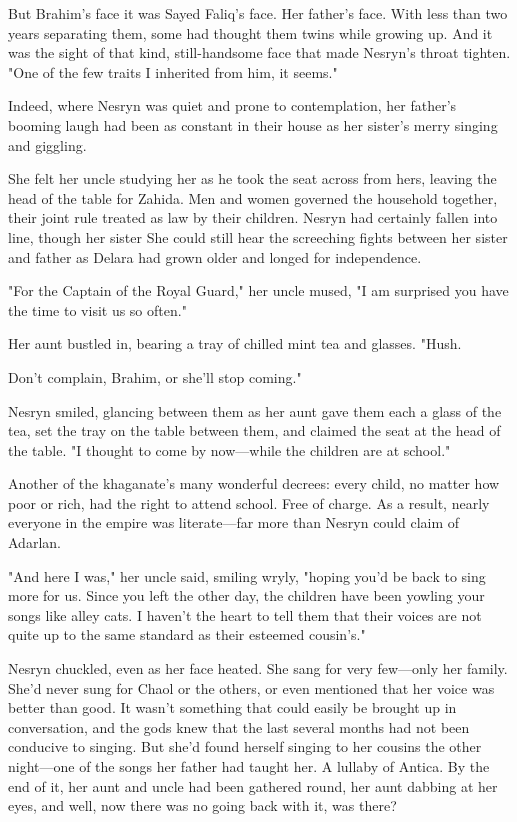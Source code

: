 But Brahim's face  it was Sayed Faliq's face. Her father's face. With less than two years separating them, some had thought them twins while growing up. And it was the sight of that kind, still-handsome face that made Nesryn's throat tighten. "One of the few traits I inherited from him, it seems."

Indeed, where Nesryn was quiet and prone to contemplation, her father's booming laugh had been as constant in their house as her sister's merry singing and giggling.

She felt her uncle studying her as he took the seat across from hers, leaving the head of the table for Zahida. Men and women governed the household together, their joint rule treated as law by their children. Nesryn had certainly fallen into line, though her sister  She could still hear the screeching fights between her sister and father as Delara had grown older and longed for independence.

"For the Captain of the Royal Guard," her uncle mused, "I am surprised you have the time to visit us so often."

Her aunt bustled in, bearing a tray of chilled mint tea and glasses. "Hush.

Don't complain, Brahim, or she'll stop coming."

Nesryn smiled, glancing between them as her aunt gave them each a glass of the tea, set the tray on the table between them, and claimed the seat at the head of the table. "I thought to come by now---while the children are at school."

Another of the khaganate's many wonderful decrees: every child, no matter how poor or rich, had the right to attend school. Free of charge. As a result, nearly everyone in the empire was literate---far more than Nesryn could claim of Adarlan.

"And here I was," her uncle said, smiling wryly, "hoping you'd be back to sing more for us. Since you left the other day, the children have been yowling your songs like alley cats. I haven't the heart to tell them that their voices are not quite up to the same standard as their esteemed cousin's."

Nesryn chuckled, even as her face heated. She sang for very few---only her family. She'd never sung for Chaol or the others, or even mentioned that her voice was  better than good. It wasn't something that could easily be brought up in conversation, and the gods knew that the last several months had not been conducive to singing. But she'd found herself singing to her cousins the other night---one of the songs her father had taught her. A lullaby of Antica. By the end of it, her aunt and uncle had been gathered round, her aunt dabbing at her eyes, and
 well, now there was no going back with it, was there?


